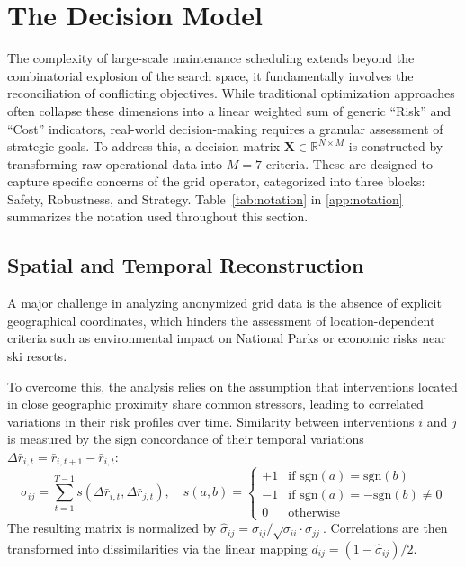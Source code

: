 \section{The Decision Model}
\label{sec:decision_model}

The complexity of large-scale maintenance scheduling extends beyond the combinatorial explosion of the search space, it fundamentally involves the reconciliation of conflicting objectives. While traditional optimization approaches often collapse these dimensions into a linear weighted sum of generic ``Risk'' and ``Cost'' indicators, real-world decision-making requires a granular assessment of strategic goals. To address this, a decision matrix $\mathbf{X} \in \mathbb{R}^{N \times M}$ is constructed by transforming raw operational data into $M=7$ criteria. These are designed to capture specific concerns of the grid operator, categorized into three blocks: Safety, Robustness, and Strategy. Table~\ref{tab:notation} in \ref{app:notation} summarizes the notation used throughout this section.

\subsection{Spatial and Temporal Reconstruction}

A major challenge in analyzing anonymized grid data is the absence of explicit geographical coordinates, which hinders the assessment of location-dependent criteria such as environmental impact on National Parks or economic risks near ski resorts.

To overcome this, the analysis relies on the assumption that interventions located in close geographic proximity share common stressors, leading to correlated variations in their risk profiles over time. Similarity between interventions $i$ and $j$ is measured by the sign concordance of their temporal variations $\Delta \bar{r}_{i,t} = \bar{r}_{i,t+1} - \bar{r}_{i,t}$:
\[
\sigma_{ij} = \sum_{t=1}^{T-1} s(\Delta \bar{r}_{i,t}, \Delta \bar{r}_{j,t}), \quad
s(a,b) = \begin{cases}
+1 & \text{if } \text{sgn}(a) = \text{sgn}(b) \\
-1 & \text{if } \text{sgn}(a) = -\text{sgn}(b) \neq 0 \\
0 & \text{otherwise}
\end{cases}
\]
The resulting matrix is normalized by $\hat{\sigma}_{ij} = \sigma_{ij} / \sqrt{\sigma_{ii} \cdot \sigma_{jj}}$. Correlations are then transformed into dissimilarities via the linear mapping $d_{ij} = (1 - \hat{\sigma}_{ij}) / 2$. 

